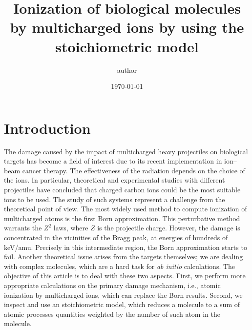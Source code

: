 \documentclass[preprint,12pt]{article}
\begin{document}
\title{Ionization of biological molecules by multicharged ions by using 
the stoichiometric model}
\author{author}
\date{\today }

\maketitle

\begin{abstract}
\end{abstract}


\section{Introduction}

The damage caused by the impact of multicharged heavy projectiles on 
biological targets has become a field of interest due to its recent 
implementation in ion--beam cancer therapy. The effectiveness of the 
radiation depends on the choice of the ions. In particular, theoretical 
and experimental studies with different projectiles have concluded that 
charged carbon ions could be the most suitable ions to be used. The 
study of such systems represent a challenge from the theoretical point 
of view. The most widely used method to compute ionization of 
multicharged atoms is the first Born approximation. This perturbative 
method warrants the $Z^{2}$ laws, where $Z$ is the projectile charge. 
However, the damage is concentrated in the vicinities of the Bragg peak,
at energies of hundreds of keV/amu. Precisely in this intermediate 
region, the Born approximation starts to fail. Another theoretical 
issue arises from the targets themselves; we are dealing with complex 
molecules, which are a hard task for {\it ab initio} calculations. 
The objective of this article is to deal with these two aspects. 
First, we perform more appropriate calculations on the primary damage 
mechanism, i.e., atomic ionization by multicharged ions, which can 
replace the Born results. Second, we inspect and use an stoichiometric 
model, which reduces a molecule to a sum of atomic processes quantities 
weighted by the number of such atom in the molecule.
\end{document}
